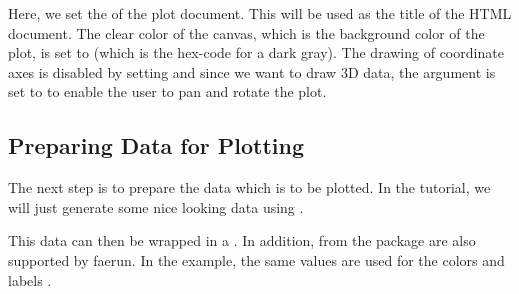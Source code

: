 \documentclass[letterpaper,10pt,english]{sphinxmanual}
\begin{document}
Here, we set the  of the plot document. This will be used as the title of the HTML document. The clear color of the canvas, which is the background color of the plot, is set to  (which is the hex-code for a dark gray).
The drawing of coordinate axes is disabled by setting  and since we want to draw 3D data, the argument  is set to  to enable the user to pan and rotate the plot.


\subsection{Preparing Data for Plotting}
\label{\detokenize{tutorial:preparing-data-for-plotting}}
The next step is to prepare the data which is to be plotted. In the tutorial, we will just generate some nice looking data using .

\begin{sphinxVerbatim}[commandchars=\\\{\}]
   

    
    
    
    
\end{sphinxVerbatim}

This data can then be wrapped in a . In addition,  from the  package are also supported by faerun.
In the example, the same values are used for the colors  and labels .

\begin{sphinxVerbatim}[commandchars=\\\{\}]
           
\end{sphinxVerbatim}
\end{document}
